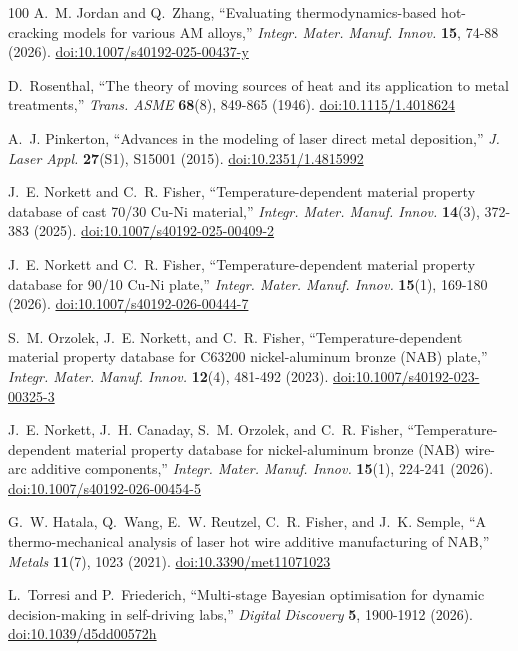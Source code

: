 \documentclass[12pt,letterpaper]{article}
\begin{document}
\begin{thebibliography}{100}
A.~M. Jordan and Q.~Zhang, ``Evaluating thermodynamics-based hot-cracking models for various AM alloys,'' \emph{Integr. Mater. Manuf. Innov.} \textbf{15}, 74-88 (2026).
\href{https://doi.org/10.1007/s40192-025-00437-y}{doi:10.1007/s40192-025-00437-y}

D.~Rosenthal, ``The theory of moving sources of heat and its application to metal treatments,'' \emph{Trans. ASME} \textbf{68}(8), 849-865 (1946).
\href{https://doi.org/10.1115/1.4018624}{doi:10.1115/1.4018624}

A.~J. Pinkerton, ``Advances in the modeling of laser direct metal deposition,'' \emph{J. Laser Appl.} \textbf{27}(S1), S15001 (2015).
\href{https://doi.org/10.2351/1.4815992}{doi:10.2351/1.4815992}

J.~E. Norkett and C.~R. Fisher, ``Temperature-dependent material property database of cast 70/30 Cu-Ni material,'' \emph{Integr. Mater. Manuf. Innov.} \textbf{14}(3), 372-383 (2025).
\href{https://doi.org/10.1007/s40192-025-00409-2}{doi:10.1007/s40192-025-00409-2}

J.~E. Norkett and C.~R. Fisher, ``Temperature-dependent material property database for 90/10 Cu-Ni plate,'' \emph{Integr. Mater. Manuf. Innov.} \textbf{15}(1), 169-180 (2026).
\href{https://doi.org/10.1007/s40192-026-00444-7}{doi:10.1007/s40192-026-00444-7}

S.~M. Orzolek, J.~E. Norkett, and C.~R. Fisher, ``Temperature-dependent material property database for C63200 nickel-aluminum bronze (NAB) plate,'' \emph{Integr. Mater. Manuf. Innov.} \textbf{12}(4), 481-492 (2023).
\href{https://doi.org/10.1007/s40192-023-00325-3}{doi:10.1007/s40192-023-00325-3}

J.~E. Norkett, J.~H. Canaday, S.~M. Orzolek, and C.~R. Fisher, ``Temperature-dependent material property database for nickel-aluminum bronze (NAB) wire-arc additive components,'' \emph{Integr. Mater. Manuf. Innov.} \textbf{15}(1), 224-241 (2026).
\href{https://doi.org/10.1007/s40192-026-00454-5}{doi:10.1007/s40192-026-00454-5}

G.~W. Hatala, Q.~Wang, E.~W. Reutzel, C.~R. Fisher, and J.~K. Semple, ``A thermo-mechanical analysis of laser hot wire additive manufacturing of NAB,'' \emph{Metals} \textbf{11}(7), 1023 (2021).
\href{https://doi.org/10.3390/met11071023}{doi:10.3390/met11071023}

L.~Torresi and P.~Friederich, ``Multi-stage Bayesian optimisation for dynamic
decision-making in self-driving labs,'' \emph{Digital Discovery} \textbf{5},
1900-1912 (2026).
\href{https://doi.org/10.1039/d5dd00572h}{doi:10.1039/d5dd00572h}


\end{thebibliography}
\end{document}
